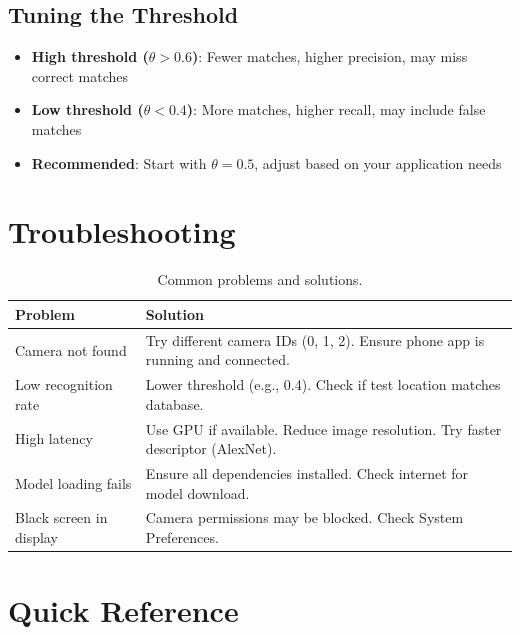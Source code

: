\documentclass[11pt,a4paper]{article}
\begin{document}
\subsection{Tuning the Threshold}

\begin{itemize}
    \item \textbf{High threshold ($\theta > 0.6$)}: Fewer matches, higher precision, may miss correct matches
    \item \textbf{Low threshold ($\theta < 0.4$)}: More matches, higher recall, may include false matches
    \item \textbf{Recommended}: Start with $\theta = 0.5$, adjust based on your application needs
\end{itemize}

\newpage
\section{Troubleshooting}

\begin{table}[H]
    \centering
    \begin{tabular}{p{4cm}p{8cm}}
        \toprule
        \textbf{Problem} & \textbf{Solution} \\
        \midrule
        Camera not found & Try different camera IDs (0, 1, 2). Ensure phone app is running and connected. \\
        \midrule
        Low recognition rate & Lower threshold (e.g., 0.4). Check if test location matches database. \\
        \midrule
        High latency & Use GPU if available. Reduce image resolution. Try faster descriptor (AlexNet). \\
        \midrule
        Model loading fails & Ensure all dependencies installed. Check internet for model download. \\
        \midrule
        Black screen in display & Camera permissions may be blocked. Check System Preferences. \\
        \bottomrule
    \end{tabular}
    \caption{Common problems and solutions.}
\end{table}

\section{Quick Reference}
\end{document}
